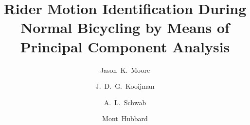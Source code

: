%
%
%
%
%
%
\documentclass[smallextended]{svjour3}     %
%
\smartqed  %
%
\usepackage{graphicx}
%
\usepackage{mathptmx}      %
%
\usepackage{subfig}
\usepackage[title]{appendix}

%
%
%


\title{Rider Motion Identification During Normal Bicycling by Means of Principal Component Analysis%
}


\author{Jason~K.~Moore \and
        J.~D.~G.~Kooijman \and
	    A.~L.~Schwab \and
	    Mont~Hubbard %
}



